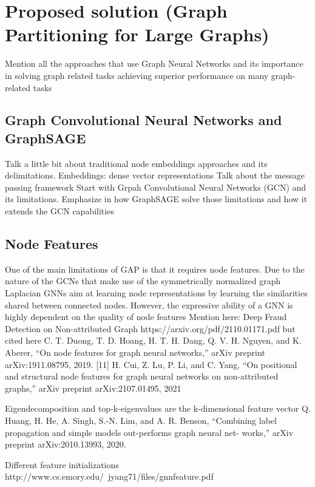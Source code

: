 %
%
\let\textcircled=\pgftextcircled
\chapter{Proposed solution (Graph Partitioning for Large Graphs)}
\label{Chapter3}
Mention all the approaches that use Graph Neural Networks and its importance in solving graph related tasks
achieving superior performance on many graph-related tasks
\section{Graph Convolutional Neural Networks and GraphSAGE}
Talk a little bit about traditional node embeddings approaches and its delimitations.
 Embeddings: dense vector representations
Talk about the message passing framework
Start with Grpah Convolutional Neural Networks (GCN) and its limitations. Emphasize in how GraphSAGE solve those limitations and how it extends the GCN capabilities

\section{Node Features}
One of the main limitations of GAP is that it requires node features. Due to the nature of the GCNs that make use of the symmetrically normalized graph Laplacian
GNNs aim at learning node
representations by learning the similarities shared between
connected nodes. However, the expressive ability of a GNN
is highly dependent on the quality of node features
Mention here: Deep Fraud Detection on Non-attributed Graph
https://arxiv.org/pdf/2110.01171.pdf
but cited here
C. T. Duong, T. D. Hoang, H. T. H. Dang, Q. V. H. Nguyen, and
K. Aberer, “On node features for graph neural networks,” arXiv preprint
arXiv:1911.08795, 2019.
[11] H. Cui, Z. Lu, P. Li, and C. Yang, “On positional and structural node
features for graph neural networks on non-attributed graphs,” arXiv
preprint arXiv:2107.01495, 2021

Eigendecomposition and top-k-eigenvalues are the k-dimensional feature vector
Q. Huang, H. He, A. Singh, S.-N. Lim, and A. R. Benson, “Combining
label propagation and simple models out-performs graph neural net-
works,” arXiv preprint arXiv:2010.13993, 2020.

Different feature initializations
http://www.cs.emory.edu/~jyang71/files/gnnfeature.pdf


